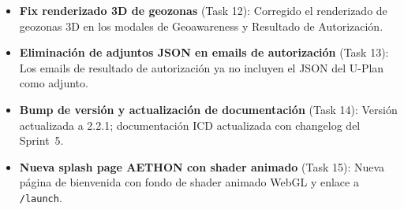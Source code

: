 \documentclass[12pt,a4paper]{article}
\begin{document}
\begin{itemize}
    \item \textbf{Fix renderizado 3D de geozonas} (Task 12): Corregido el renderizado de geozonas 3D en los modales de Geoawareness y Resultado de Autorización.
    \item \textbf{Eliminación de adjuntos JSON en emails de autorización} (Task 13): Los emails de resultado de autorización ya no incluyen el JSON del U-Plan como adjunto.
    \item \textbf{Bump de versión y actualización de documentación} (Task 14): Versión actualizada a 2.2.1; documentación ICD actualizada con changelog del Sprint~5.
    \item \textbf{Nueva splash page AETHON con shader animado} (Task 15): Nueva página de bienvenida con fondo de shader animado WebGL y enlace a \texttt{/launch}.
\end{itemize}
\end{document}
